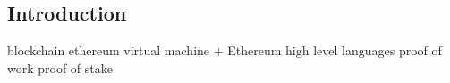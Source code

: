 
\subsection{Introduction}

blockchain
ethereum virtual machine
+ Ethereum high level languages
proof of work
proof of stake


